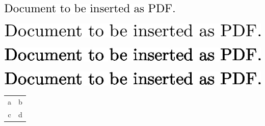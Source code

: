 \documentclass{scrartcl}
\providecommand{\AsPicture}[1]{#1}
\begin{document}
      \includegraphics{pic/img}

      \includegraphics{pic/img2}

      \includegraphics{pic/img3}

      \includegraphics{pic/img4}

      \AsPicture{
        \begin{tabular}{cc}
          a & b \\
          c & d \\
        \end{tabular}
      }
    
\end{document}
